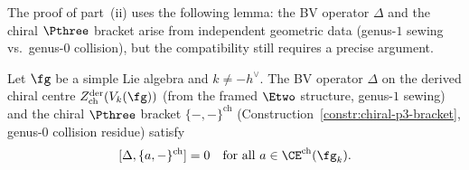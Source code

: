 The proof of part~(ii) uses the following lemma:
the BV operator $\Delta$ and the chiral $\Pthree$ bracket
arise from independent geometric data (genus-$1$ sewing
vs.\ genus-$0$ collision), but the compatibility still
requires a precise argument.

\begin{lemma}
\label{lem:bv-p3-commutativity}
\ClaimStatusProvedHere
Let $\fg$ be a simple Lie algebra and $k \neq -h^\vee$.
The BV operator $\Delta$ on the derived chiral centre
$Z^{\mathrm{der}}_{\mathrm{ch}}(V_k(\fg))$
\textup{(}from the framed $\Etwo$ structure,
genus-$1$ sewing\textup{)} and the chiral $\Pthree$
bracket $\{-,-\}^{\mathrm{ch}}$
\textup{(}Construction~\textup{\ref{constr:chiral-p3-bracket}},
genus-$0$ collision residue\textup{)} satisfy
\begin{equation}\label{eq:bv-p3-commute}
 [\Delta, \{a,-\}^{\mathrm{ch}}] = 0
 \quad \text{for all } a \in \CE^{\mathrm{ch}}(\fg_k).
\end{equation}
\end{lemma}

